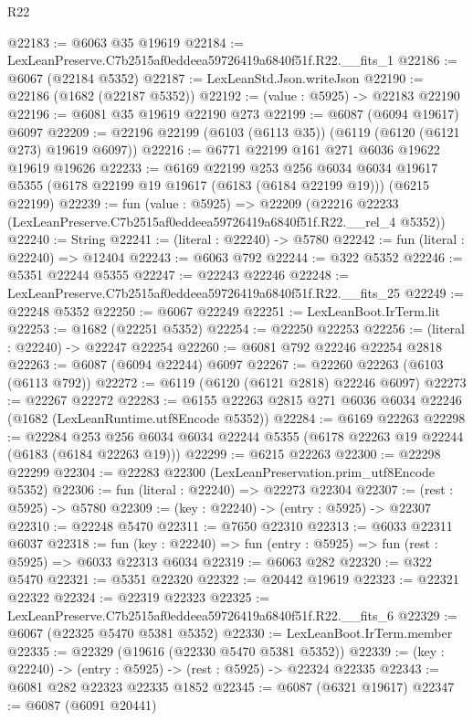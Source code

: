 \begin{lexlean}{R22}
\begin{coremodule}
@22183 := @6063 @35 @19619
@22184 := LexLeanPreserve.C7b2515af0eddeea59726419a6840f51f.R22.__fits_1
@22186 := @6067 (@22184 @5352)
@22187 := LexLeanStd.Json.writeJson
@22190 := @22186 (@1682 (@22187 @5352))
@22192 := (value : @5925) -> @22183 @22190
@22196 := @6081 @35 @19619 @22190 @273
@22199 := @6087 (@6094 @19617) @6097
@22209 := @22196 @22199 (@6103 (@6113 @35)) (@6119 (@6120 (@6121 @273) @19619 @6097))
@22216 := @6771 @22199 @161 @271 @6036 @19622 @19619 @19626
@22233 := @6169
    @22199
    @253
    @256
    @6034
    @6034
    @19617
    @5355
    (@6178 @22199 @19 @19617 (@6183 (@6184 @22199 @19)))
    (@6215 @22199)
@22239 := fun (value : @5925) =>
  @22209 (@22216 @22233 (LexLeanPreserve.C7b2515af0eddeea59726419a6840f51f.R22.__rel_4 @5352))
@22240 := String
@22241 := (literal : @22240) -> @5780
@22242 := fun (literal : @22240) => @12404
@22243 := @6063 @792
@22244 := @322 @5352
@22246 := @5351 @22244 @5355
@22247 := @22243 @22246
@22248 := LexLeanPreserve.C7b2515af0eddeea59726419a6840f51f.R22.__fits_25
@22249 := @22248 @5352
@22250 := @6067 @22249
@22251 := LexLeanBoot.IrTerm.lit
@22253 := @1682 (@22251 @5352)
@22254 := @22250 @22253
@22256 := (literal : @22240) -> @22247 @22254
@22260 := @6081 @792 @22246 @22254 @2818
@22263 := @6087 (@6094 @22244) @6097
@22267 := @22260 @22263 (@6103 (@6113 @792))
@22272 := @6119 (@6120 (@6121 @2818) @22246 @6097)
@22273 := @22267 @22272
@22283 := @6155 @22263 @2815 @271 @6036 @6034 @22246 (@1682 (LexLeanRuntime.utf8Encode @5352))
@22284 := @6169 @22263
@22298 := @22284
    @253
    @256
    @6034
    @6034
    @22244
    @5355
    (@6178 @22263 @19 @22244 (@6183 (@6184 @22263 @19)))
@22299 := @6215 @22263
@22300 := @22298 @22299
@22304 := @22283 @22300 (LexLeanPreservation.prim_utf8Encode @5352)
@22306 := fun (literal : @22240) => @22273 @22304
@22307 := (rest : @5925) -> @5780
@22309 := (key : @22240) -> (entry : @5925) -> @22307
@22310 := @22248 @5470
@22311 := @7650 @22310
@22313 := @6033 @22311 @6037
@22318 := fun (key : @22240) => fun (entry : @5925) => fun (rest : @5925) => @6033 @22313 @6034
@22319 := @6063 @282
@22320 := @322 @5470
@22321 := @5351 @22320
@22322 := @20442 @19619
@22323 := @22321 @22322
@22324 := @22319 @22323
@22325 := LexLeanPreserve.C7b2515af0eddeea59726419a6840f51f.R22.__fits_6
@22329 := @6067 (@22325 @5470 @5381 @5352)
@22330 := LexLeanBoot.IrTerm.member
@22335 := @22329 (@19616 (@22330 @5470 @5381 @5352))
@22339 := (key : @22240) -> (entry : @5925) -> (rest : @5925) -> @22324 @22335
@22343 := @6081 @282 @22323 @22335 @1852
@22345 := @6087 (@6321 @19617)
@22347 := @6087 (@6091 @20441)

\end{coremodule}
\end{lexlean}
